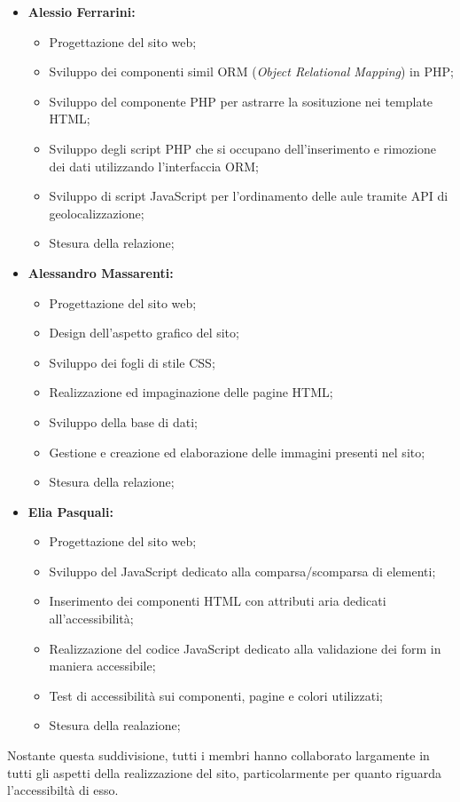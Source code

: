 \begin{itemize}
    \item \textbf{Alessio Ferrarini:}
        \begin{itemize}
            \item Progettazione del sito web;
            \item Sviluppo dei componenti simil ORM (\textit{Object Relational Mapping}) in PHP;
            \item Sviluppo del componente PHP per astrarre la sosituzione nei template HTML;
            \item Sviluppo degli script PHP che si occupano dell'inserimento e rimozione dei dati utilizzando l'interfaccia ORM;
            \item Sviluppo di script JavaScript per l'ordinamento delle aule tramite API di geolocalizzazione;
            \item Stesura della relazione;
        \end{itemize}
    \item \textbf{Alessandro Massarenti:}
        \begin{itemize}
            \item Progettazione del sito web;
            \item Design dell'aspetto grafico del sito;
            \item Sviluppo dei fogli di stile CSS;
            \item Realizzazione ed impaginazione delle pagine HTML;
            \item Sviluppo della base di dati;
            \item Gestione e creazione ed elaborazione delle immagini presenti nel sito;
            \item Stesura della relazione;
        \end{itemize}
    \item \textbf{Elia Pasquali:}
        \begin{itemize}
            \item Progettazione del sito web;
            \item Sviluppo del JavaScript dedicato alla comparsa/scomparsa di elementi;
            \item Inserimento dei componenti HTML con attributi aria dedicati all'accessibilità;
            \item Realizzazione del codice JavaScript dedicato alla validazione dei form in maniera accessibile;
            \item Test di accessibilità sui componenti, pagine e colori utilizzati;
            \item Stesura della realazione;
        \end{itemize}
\end{itemize}

Nostante questa suddivisione, tutti i membri hanno collaborato largamente in tutti gli aspetti della realizzazione del sito, particolarmente per quanto riguarda l'accessibiltà di esso.